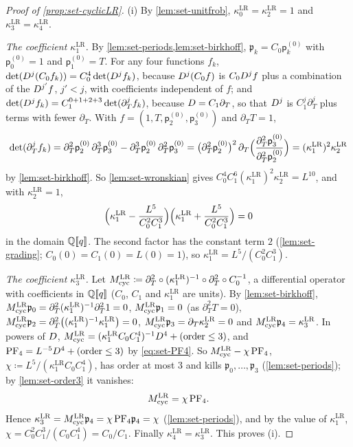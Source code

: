 \begin{proof}[Proof of \cref{prop:set-cyclicLR}]
(i) By \cref{lem:set-unitfrob}, $\kappa^{\mathrm{LR}}_0=\kappa^{\mathrm{LR}}_2=1$ and $\kappa^{\mathrm{LR}}_3=\kappa^{\mathrm{LR}}_4$.

\emph{The coefficient $\kappa^{\mathrm{LR}}_1$.} By \cref{lem:set-periods,lem:set-birkhoff}, $\mathfrak p_k=C_0\mathsf p^{(0)}_k$ with $\mathsf p^{(0)}_0=1$ and $\mathsf p^{(0)}_1=T$. For any four functions $f_k$, $\det(D^j(C_0f_k))=C_0^4\det(D^jf_k)$, because $D^j(C_0f)$ is $C_0D^jf$ plus a combination of the $D^{j'}f$, $j'<j$, with coefficients independent of $f$; and $\det(D^jf_k)=C_1^{0+1+2+3}\det(\partial_T^jf_k)$, because $D=C_1\partial_T$, so that $D^j$ is $C_1^j\partial_T^j$ plus terms with fewer $\partial_T$. With $f=(1,T,\mathsf p^{(0)}_2,\mathsf p^{(0)}_3)$ and $\partial_TT=1$,
\[
\det(\partial_T^jf_k)=\partial_T^2\mathsf p^{(0)}_2\,\partial_T^3\mathsf p^{(0)}_3-\partial_T^3\mathsf p^{(0)}_2\,\partial_T^2\mathsf p^{(0)}_3=\bigl(\partial_T^2\mathsf p^{(0)}_2\bigr)^2\,\partial_T\Bigl(\frac{\partial_T^2\mathsf p^{(0)}_3}{\partial_T^2\mathsf p^{(0)}_2}\Bigr)=(\kappa^{\mathrm{LR}}_1)^2\kappa^{\mathrm{LR}}_2
\]
by \cref{lem:set-birkhoff}. So \cref{lem:set-wronskian} gives $C_0^4C_1^6(\kappa^{\mathrm{LR}}_1)^2\kappa^{\mathrm{LR}}_2=L^{10}$, and with $\kappa^{\mathrm{LR}}_2=1$,
\[
\Bigl(\kappa^{\mathrm{LR}}_1-\frac{L^5}{C_0^2C_1^3}\Bigr)\Bigl(\kappa^{\mathrm{LR}}_1+\frac{L^5}{C_0^2C_1^3}\Bigr)=0
\]
in the domain $\mathbb{Q}[\![ q ]\!]$. The second factor has the constant term $2$ (\cref{lem:set-grading}; $C_0(0)=C_1(0)=L(0)=1$), so $\kappa^{\mathrm{LR}}_1=L^5/(C_0^2C_1^3)$.

\emph{The coefficient $\kappa^{\mathrm{LR}}_3$.} Let $M_{\mathrm{cyc}}^{\mathrm{LR}}\coloneqq\partial_T^2\circ(\kappa^{\mathrm{LR}}_1)^{-1}\circ\partial_T^2\circ C_0^{-1}$, a differential operator with coefficients in $\mathbb{Q}[\![ q ]\!]$ ($C_0$, $C_1$ and $\kappa^{\mathrm{LR}}_1$ are units). By \cref{lem:set-birkhoff}, $M_{\mathrm{cyc}}^{\mathrm{LR}}\mathfrak p_0=\partial_T^2(\kappa^{\mathrm{LR}}_1)^{-1}\partial_T^21=0$, $M_{\mathrm{cyc}}^{\mathrm{LR}}\mathfrak p_1=0$ (as $\partial_T^2T=0$), $M_{\mathrm{cyc}}^{\mathrm{LR}}\mathfrak p_2=\partial_T^2\bigl((\kappa^{\mathrm{LR}}_1)^{-1}\kappa^{\mathrm{LR}}_1\bigr)=0$, $M_{\mathrm{cyc}}^{\mathrm{LR}}\mathfrak p_3=\partial_T\kappa^{\mathrm{LR}}_2=0$ and $M_{\mathrm{cyc}}^{\mathrm{LR}}\mathfrak p_4=\kappa^{\mathrm{LR}}_3$. In powers of $D$, $M_{\mathrm{cyc}}^{\mathrm{LR}}=(\kappa^{\mathrm{LR}}_1C_0C_1^4)^{-1}D^4+(\text{order}\leq3)$, and $\mathrm{PF}_{4}=L^{-5}D^4+(\text{order}\leq3)$ by \eqref{eq:set-PF4}. So $M_{\mathrm{cyc}}^{\mathrm{LR}}-\chi\,\mathrm{PF}_{4}$, $\chi\coloneqq L^5/(\kappa^{\mathrm{LR}}_1C_0C_1^4)$, has order at most $3$ and kills $\mathfrak p_0,\dots,\mathfrak p_3$ (\cref{lem:set-periods}); by \cref{lem:set-order3} it vanishes:
\[
M_{\mathrm{cyc}}^{\mathrm{LR}}=\chi\,\mathrm{PF}_{4} .
\]
Hence $\kappa^{\mathrm{LR}}_3=M_{\mathrm{cyc}}^{\mathrm{LR}}\mathfrak p_4=\chi\,\mathrm{PF}_{4}\mathfrak p_4=\chi$ (\cref{lem:set-periods}), and by the value of $\kappa^{\mathrm{LR}}_1$, $\chi=C_0^2C_1^3/(C_0C_1^4)=C_0/C_1$. Finally $\kappa^{\mathrm{LR}}_4=\kappa^{\mathrm{LR}}_3$. This proves (i).


\end{proof}
